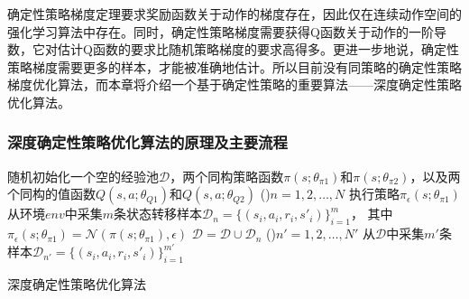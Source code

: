 确定性策略梯度定理要求奖励函数关于动作的梯度存在，因此仅在连续动作空间的强化学习算法中存在。同时，确定性策略梯度需要获得Q函数关于动作的一阶导数，它对估计Q函数的要求比随机策略梯度的要求高得多。更进一步地说，确定性策略梯度需要更多的样本，才能被准确地估计。所以目前没有同策略的确定性策略梯度优化算法，而本章将介绍一个基于确定性策略的重要算法——深度确定性策略优化算法。

\subsubsection{深度确定性策略优化算法的原理及主要流程}

\begin{algorithm}[htbp]
    \LinesNumbered

    随机初始化一个空的经验池$\mathcal{D}$，两个同构策略函数$\pi(s; \theta_{\pi1})$和$\pi(s; \theta_{\pi2})$，以及两个同构的值函数$Q(s, a; \theta_{Q1})$和$Q(s, a; \theta_{Q2})$\;
    \For(){$n = 1,2, \ldots, N$}{
        执行策略$\pi_{\epsilon}(s; \theta_{\pi1})$从环境$env$中采集$m$条状态转移样本$\mathcal{D}_n = \{(s_i, a_i, r_i, s'_i)\}^{m}_{i=1}$，
        其中$\pi_{\epsilon}(s; \theta_{\pi1}) = \mathcal{N}(\pi(s;\theta_{\pi1}), \epsilon)$\;
        $\mathcal{D} = \mathcal{D} \cup \mathcal{D}_n$\;
        \For(){$n' = 1, 2, \ldots, N'$}{
            从$\mathcal{D}$中采集$m'$条样本$\mathcal{D}_{n'} = \{(s_i, a_i, r_i, s'_i)\}^{m'}_{i=1}$\;
            \;
        }
    }
    \caption{深度确定性策略优化算法}
    \label{alg:ddpg}
\end{algorithm}

